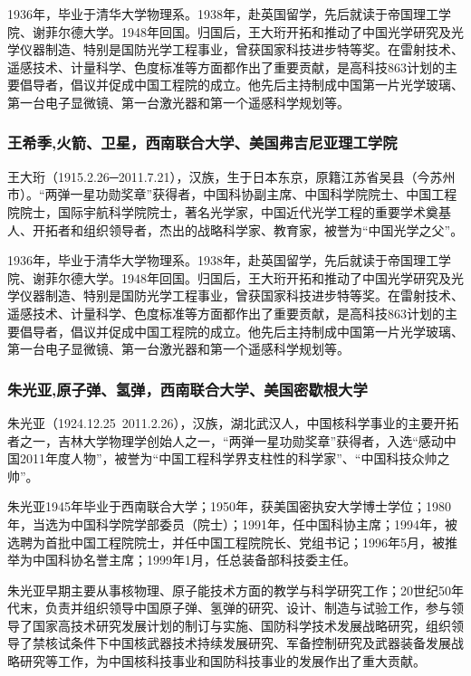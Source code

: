 \documentclass[UTF8]{ctexart}
\begin{document}
1936年，毕业于清华大学物理系。1938年，赴英国留学，先后就读于帝国理工学院、谢菲尔德大学。1948年回国。归国后，王大珩开拓和推动了中国光学研究及光学仪器制造、特别是国防光学工程事业，曾获国家科技进步特等奖。在雷射技术、遥感技术、计量科学、色度标准等方面都作出了重要贡献，是高科技863计划的主要倡导者，倡议并促成中国工程院的成立。他先后主持制成中国第一片光学玻璃、第一台电子显微镜、第一台激光器和第一个遥感科学规划等。
    \subsubsection{王希季,火箭、卫星，西南联合大学、美国弗吉尼亚理工学院}

王大珩（1915.2.26─2011.7.21），汉族，生于日本东京，原籍江苏省吴县（今苏州市）。“两弹一星功勋奖章”获得者，中国科协副主席、中国科学院院士、中国工程院院士，国际宇航科学院院士，著名光学家，中国近代光学工程的重要学术奠基人、开拓者和组织领导者，杰出的战略科学家、教育家，被誉为“中国光学之父”。


1936年，毕业于清华大学物理系。1938年，赴英国留学，先后就读于帝国理工学院、谢菲尔德大学。1948年回国。归国后，王大珩开拓和推动了中国光学研究及光学仪器制造、特别是国防光学工程事业，曾获国家科技进步特等奖。在雷射技术、遥感技术、计量科学、色度标准等方面都作出了重要贡献，是高科技863计划的主要倡导者，倡议并促成中国工程院的成立。他先后主持制成中国第一片光学玻璃、第一台电子显微镜、第一台激光器和第一个遥感科学规划等。
    \subsubsection{朱光亚,原子弹、氢弹，西南联合大学、美国密歇根大学}
朱光亚（1924.12.25~2011.2.26），汉族，湖北武汉人，中国核科学事业的主要开拓者之一，吉林大学物理学创始人之一，“两弹一星功勋奖章”获得者，入选“感动中国2011年度人物”，被誉为“中国工程科学界支柱性的科学家”、“中国科技众帅之帅”。 

朱光亚1945年毕业于西南联合大学；1950年，获美国密执安大学博士学位；1980年，当选为中国科学院学部委员（院士）；1991年，任中国科协主席；1994年，被选聘为首批中国工程院院士，并任中国工程院院长、党组书记；1996年5月，被推举为中国科协名誉主席；1999年1月，任总装备部科技委主任。 

朱光亚早期主要从事核物理、原子能技术方面的教学与科学研究工作；20世纪50年代末，负责并组织领导中国原子弹、氢弹的研究、设计、制造与试验工作，参与领导了国家高技术研究发展计划的制订与实施、国防科学技术发展战略研究，组织领导了禁核试条件下中国核武器技术持续发展研究、军备控制研究及武器装备发展战略研究等工作，为中国核科技事业和国防科技事业的发展作出了重大贡献。
\end{document}
